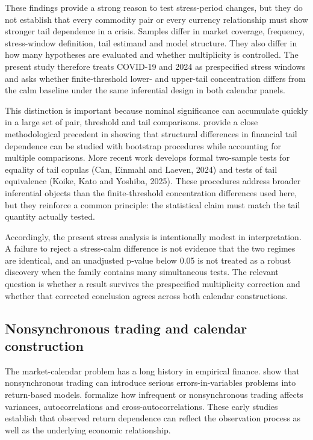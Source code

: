 These findings provide a strong reason to test stress-period changes, but they do not establish that every commodity pair or every currency relationship must show stronger tail dependence in a crisis. Samples differ in market coverage, frequency, stress-window definition, tail estimand and model structure. They also differ in how many hypotheses are evaluated and whether multiplicity is controlled. The present study therefore treats COVID-19 and 2024 as prespecified stress windows and asks whether finite-threshold lower- and upper-tail concentration differs from the calm baseline under the same inferential design in both calendar panels.

This distinction is important because nominal significance can accumulate quickly in a large set of pair, threshold and tail comparisons. \citet{bormann2020} provide a close methodological precedent in showing that structural differences in financial tail dependence can be studied with bootstrap procedures while accounting for multiple comparisons. More recent work develops formal two-sample tests for equality of tail copulas (Can, Einmahl and Laeven, 2024) and tests of tail equivalence (Koike, Kato and Yoshiba, 2025). These procedures address broader inferential objects than the finite-threshold concentration differences used here, but they reinforce a common principle: the statistical claim must match the tail quantity actually tested.

Accordingly, the present stress analysis is intentionally modest in interpretation. A failure to reject a stress-calm difference is not evidence that the two regimes are identical, and an unadjusted p-value below 0.05 is not treated as a robust discovery when the family contains many simultaneous tests. The relevant question is whether a result survives the prespecified multiplicity correction and whether that corrected conclusion agrees across both calendar constructions.

\subsection{Nonsynchronous trading and calendar construction}

The market-calendar problem has a long history in empirical finance. \citet{scholes1977} show that nonsynchronous trading can introduce serious errors-in-variables problems into return-based models. \citet{lo1990} formalize how infrequent or nonsynchronous trading affects variances, autocorrelations and cross-autocorrelations. These early studies establish that observed return dependence can reflect the observation process as well as the underlying economic relationship.

